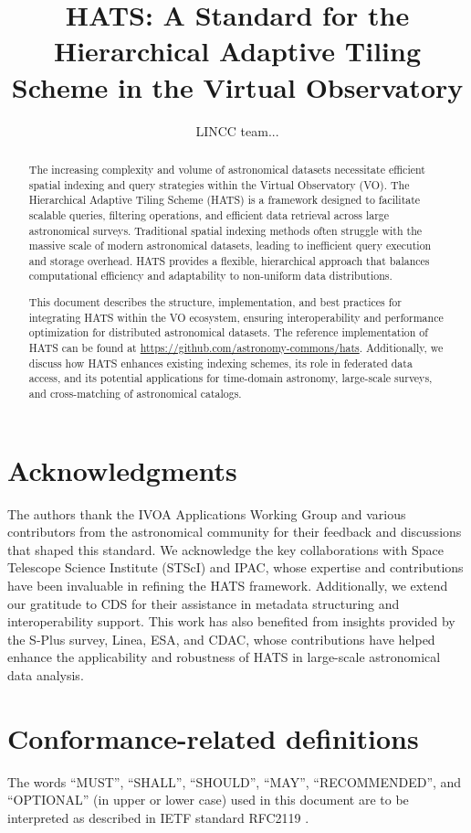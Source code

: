 \documentclass[11pt,a4paper]{ivoa}
\title{HATS: A Standard for the Hierarchical Adaptive Tiling Scheme in the Virtual Observatory}
\author[https://www.ivoa.net/authors/offline]{LINCC team...}
\begin{document}
\begin{abstract}
    The increasing complexity and volume of astronomical datasets necessitate efficient spatial indexing and query strategies within the Virtual Observatory (VO). The Hierarchical Adaptive Tiling Scheme (HATS) is a framework designed to facilitate scalable queries, filtering operations, and efficient data retrieval across large astronomical surveys. Traditional spatial indexing methods often struggle with the massive scale of modern astronomical datasets, leading to inefficient query execution and storage overhead. HATS provides a flexible, hierarchical approach that balances computational efficiency and adaptability to non-uniform data distributions.

    This document describes the structure, implementation, and best practices for integrating HATS within the VO ecosystem, ensuring interoperability and performance optimization for distributed astronomical datasets. The reference implementation of HATS can be found at \url{https://github.com/astronomy-commons/hats}. Additionally, we discuss how HATS enhances existing indexing schemes, its role in federated data access, and its potential applications for time-domain astronomy, large-scale surveys, and cross-matching of astronomical catalogs.
\end{abstract}

\section*{Acknowledgments}
    The authors thank the IVOA Applications Working Group and various contributors from the astronomical community for their feedback and discussions that shaped this standard. We acknowledge the key collaborations with Space Telescope Science Institute (STScI) and IPAC, whose expertise and contributions have been invaluable in refining the HATS framework. Additionally, we extend our gratitude to CDS for their assistance in metadata structuring and interoperability support. This work has also benefited from insights provided by the S-Plus survey, Linea, ESA, and CDAC, whose contributions have helped enhance the applicability and robustness of HATS in large-scale astronomical data analysis.


\section*{Conformance-related definitions}
The words ``MUST'', ``SHALL'', ``SHOULD'', ``MAY'', ``RECOMMENDED'', and
``OPTIONAL'' (in upper or lower case) used in this document are to be
interpreted as described in IETF standard RFC2119 \citep{std:RFC2119}.
\end{document}
